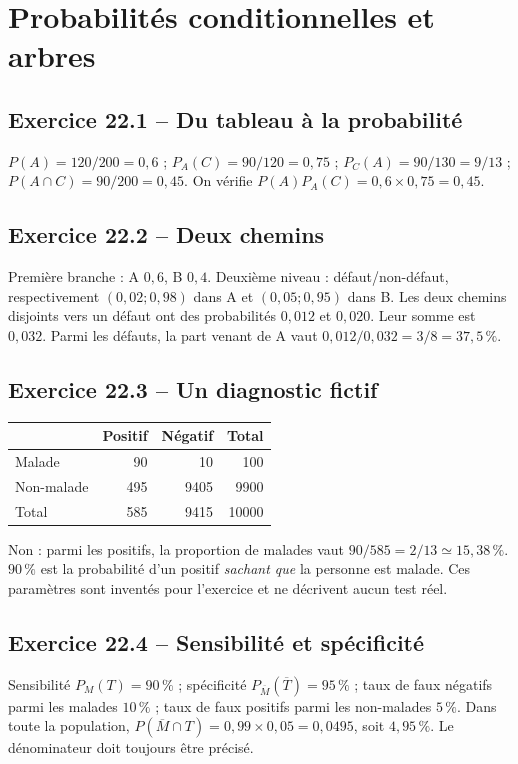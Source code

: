 \chapter{Probabilités conditionnelles et arbres}
\section*{Exercice 22.1 -- Du tableau à la probabilité}
$P(A)=120/200=0{,}6$ ; $P_A(C)=90/120=0{,}75$ ; $P_C(A)=90/130=9/13$ ; $P(A\cap C)=90/200=0{,}45$. On vérifie $P(A)P_A(C)=0{,}6\times0{,}75=0{,}45$.

\section*{Exercice 22.2 -- Deux chemins}
Première branche : A $0{,}6$, B $0{,}4$. Deuxième niveau : défaut/non-défaut, respectivement $(0{,}02;0{,}98)$ dans A et $(0{,}05;0{,}95)$ dans B. Les deux chemins disjoints vers un défaut ont des probabilités $0{,}012$ et $0{,}020$. Leur somme est $0{,}032$. Parmi les défauts, la part venant de A vaut $0{,}012/0{,}032=3/8=37{,}5\,\%$.

\section*{Exercice 22.3 -- Un diagnostic fictif}
\begin{center}\begin{tabular}{lrrr}\toprule & Positif & Négatif & Total\\\midrule Malade&90&10&100\\ Non-malade&495&9405&9900\\ Total&585&9415&10000\\\bottomrule\end{tabular}\end{center}
Non : parmi les positifs, la proportion de malades vaut $90/585=2/13\simeq15{,}38\,\%$. $90\,\%$ est la probabilité d'un positif \emph{sachant que} la personne est malade. Ces paramètres sont inventés pour l'exercice et ne décrivent aucun test réel.

\section*{Exercice 22.4 -- Sensibilité et spécificité}
Sensibilité $P_M(T)=90\,\%$ ; spécificité $P_{\overline M}(\overline T)=95\,\%$ ; taux de faux négatifs parmi les malades $10\,\%$ ; taux de faux positifs parmi les non-malades $5\,\%$. Dans toute la population, $P(\overline M\cap T)=0{,}99\times0{,}05=0{,}0495$, soit $4{,}95\,\%$. Le dénominateur doit toujours être précisé.

